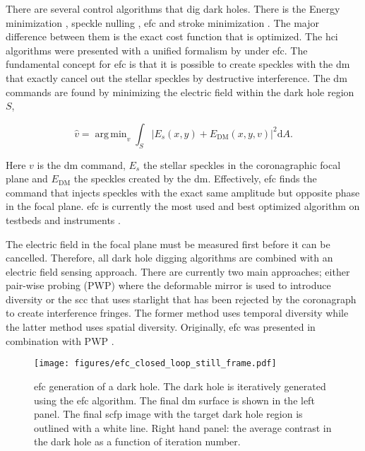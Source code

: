 \documentclass[letterpaper]{ar-1col}
\DeclareMathOperator*{\argmin}{arg\,min}
\begin{document}
There are several control algorithms that dig dark holes.
%
There is the Energy minimization \citep{borde2006high}, speckle nulling \citep{martinache2012speckle, martinache2014sky}, \acl{efc} \citep[\acs{efc}; ][]{Giveon09} and stroke minimization \citep{pueyo2009optimal}.
%
The major difference between them is the exact cost function that is optimized.
%
The \ac{hci} algorithms were presented with a unified formalism by \citet{Giveon09,Giveon10} under \ac{efc}.
%
The fundamental concept for \ac{efc} is that it is possible to create speckles with the \ac{dm} that exactly cancel out the stellar speckles by destructive interference.
%
The \ac{dm} commands are found by minimizing the electric field within the dark hole region $S$,

\begin{equation}
    \hat{v} = \argmin_v \int_S |E_{s}(x,y) + E_{\mathrm{DM}}(x, y, v)|^2\mathrm{d}A.
\end{equation}

Here $v$ is the \ac{dm} command, $E_{s}$ the stellar speckles in the coronagraphic focal plane and $E_{\mathrm{DM}}$ the speckles created by the \ac{dm}.
%
Effectively, \ac{efc} finds the command that injects speckles with the exact same amplitude but opposite phase in the focal plane.
%
\ac{efc} is currently the most used and best optimized algorithm on testbeds and instruments \citep{Mennesson24}.

The electric field in the focal plane must be measured first before it can be cancelled.
%
Therefore, all dark hole digging algorithms are combined with an electric field sensing approach.
%
There are currently two main approaches; either pair-wise probing (PWP) where the deformable mirror is used to introduce diversity or the \ac{scc} that uses starlight that has been rejected by the coronagraph to create interference fringes.
%
The former method uses temporal diversity while the latter method uses spatial diversity.
%
Originally, \ac{efc} was presented in combination with PWP \citep{Giveon09}.

\begin{figure}[ht]
  \centering
  \texttt{[image: figures/efc\_closed\_loop\_still\_frame.pdf]}
  \caption{\ac{efc} generation of a dark hole.
  The dark hole is iteratively generated using the \ac{efc} algorithm.
The final \ac{dm} surface is shown in the left panel.
%
The final \ac{scfp} image with the target dark hole region is outlined with a white line.
%
Right hand panel: the average contrast in the dark hole as a function of iteration number.}
  \label{fig:efc_darkhole}
\end{figure}
\end{document}
